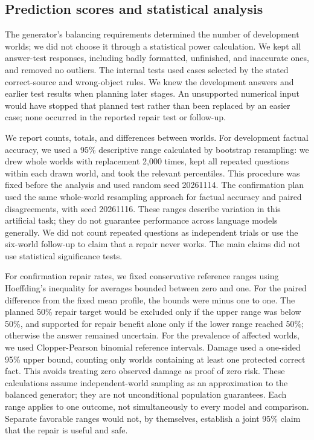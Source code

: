 \documentclass[10pt,letterpaper]{article}
\begin{document}
\subsection*{Prediction scores and statistical analysis}

The generator's balancing requirements determined the number of development worlds; we did not choose it through a statistical power calculation. We kept all answer-test responses, including badly formatted, unfinished, and inaccurate ones, and removed no outliers. The internal tests used cases selected by the stated correct-source and wrong-object rules. We knew the development answers and earlier test results when planning later stages. An unsupported numerical input would have stopped that planned test rather than been replaced by an easier case; none occurred in the reported repair test or follow-up.


We report counts, totals, and differences between worlds. For development factual accuracy, we used a 95\% descriptive range calculated by bootstrap resampling: we drew whole worlds with replacement 2,000 times, kept all repeated questions within each drawn world, and took the relevant percentiles. This procedure was fixed before the analysis and used random seed 20261114. The confirmation plan used the same whole-world resampling approach for factual accuracy and paired disagreements, with seed 20261116. These ranges describe variation in this artificial task; they do not guarantee performance across language models generally. We did not count repeated questions as independent trials or use the six-world follow-up to claim that a repair never works. The main claims did not use statistical significance tests.


For confirmation repair rates, we fixed conservative reference ranges using Hoeffding's inequality for averages bounded between zero and one. For the paired difference from the fixed mean profile, the bounds were minus one to one. The planned 50\% repair target would be excluded only if the upper range was below 50\%, and supported for repair benefit alone only if the lower range reached 50\%; otherwise the answer remained uncertain. For the prevalence of affected worlds, we used Clopper-Pearson binomial reference intervals. Damage used a one-sided 95\% upper bound, counting only worlds containing at least one protected correct fact. This avoids treating zero observed damage as proof of zero risk. These calculations assume independent-world sampling as an approximation to the balanced generator; they are not unconditional population guarantees. Each range applies to one outcome, not simultaneously to every model and comparison. Separate favorable ranges would not, by themselves, establish a joint 95\% claim that the repair is useful and safe.
\end{document}
